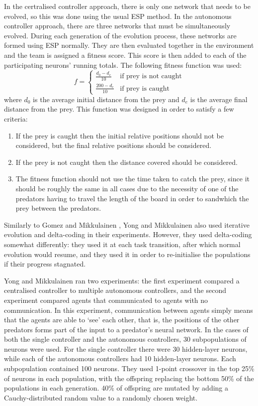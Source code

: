 \documentclass[12pt]{article} %
\begin{document}
In the certralised controller approach, there is only one network that needs to be evolved, so this was done using the usual ESP method. In the autonomous controller approach, there are three networks that must be simultaneously evolved. During each generation of the evolution process, these networks are formed using ESP normally. They are then evaluated together in the environment and the team is assigned a fitness score. This score is then added to each of the participating neurons' running totals. The following fitness function was used:
\[
f = 
\begin{cases}
\frac{d_0-d_e}{10}& \text{if prey is not caught}\\
\frac{200-d_e}{10}& \text{if prey is caught}
\end{cases}
\]
where $d_0$ is the average initial distance from the  prey and $d_e$ is the average final distance from the prey. This function was designed in order to satisfy a few criteria:
\begin{enumerate}
	\item If the prey is caught then the initial relative positions should not be considered, but the final relative positions should be considered.
	\item If the prey is not caught then the distance covered should be considered.
	\item The fitness function should not use the time taken to catch the prey, since it should be roughly the same in all cases due to the necessity of one of the predators having to travel the length of the board in order to sandwhich the prey between the predators.
\end{enumerate}
Similarly to Gomez and Mikkulainen \cite{Gomez1997}, Yong and Mikkulainen also used iterative evolution and delta-coding in their experiments. However, they used delta-coding somewhat differently: they used it at each task transition, after which normal evolution would resume, and they used it in order to re-initialise the populations if their progress stagnated.

Yong and Mikkulainen ran two experiments: the first experiment compared a centralised controller to multiple autonomous controllers, and the second experiment compared agents that communicated to agents with no communication. In this experiment, communication between agents simply means that the agents are able to `see' each other, that is, the positions of the other predators forms part of the input to a predator's neural network. In the cases of both the single controller and the autonomous controllers, 30 subpopulations of neurons were used. For the single controller there were 30 hidden-layer neurons, while each of the autonomous controllers had 10 hidden-layer neurons. Each subpopulation contained 100 neurons. They used 1-point crossover in the top 25\% of neurons in each population, with the offspring replacing the bottom 50\% of the populations in each generation. 40\% of offspring are mutated by adding a Cauchy-distributed \cite{Rudolph1997} random value to a randomly chosen weight.
\end{document}
